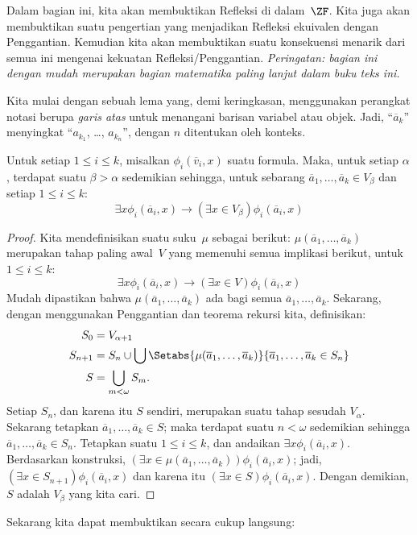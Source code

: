 \documentclass[../../../include/open-logic-section]{subfiles}
\begin{document}

Dalam bagian ini, kita akan membuktikan Refleksi di dalam~$\ZF$. Kita juga
akan membuktikan suatu pengertian yang menjadikan Refleksi ekuivalen dengan
Penggantian. Kemudian kita akan membuktikan suatu konsekuensi menarik dari
semua ini mengenai kekuatan Refleksi/Penggantian. \emph{Peringatan: bagian ini
dengan mudah merupakan bagian matematika paling lanjut dalam buku teks ini.}

Kita mulai dengan sebuah lema yang, demi keringkasan, menggunakan perangkat
notasi berupa \emph{garis atas} untuk menangani barisan variabel atau objek.
Jadi, ``$\overline{a}_k$'' menyingkat ``$a_{k_1}$, \dots, $a_{k_n}$'',
dengan $n$ ditentukan oleh konteks.

\begin{lem}
Untuk setiap $1\leq i\leq k$, misalkan
$\phi_i(\overline{v}_i,x)$ suatu formula. Maka, untuk setiap $\alpha$,
terdapat suatu $\beta>\alpha$ sedemikian sehingga, untuk sebarang
$\overline{a}_1,\ldots,\overline{a}_k\in V_\beta$ dan setiap
$1\leq i\leq k$:
\[
	\exists x\phi_i(\overline{a}_i, x) \rightarrow (\exists x \in V_\beta) \phi_i(\overline{a}_i, x)
\]
\end{lem}

\begin{proof}
Kita mendefinisikan suatu suku~$\mu$ sebagai berikut:
$\mu(\overline{a}_1,\ldots,\overline{a}_k)$ merupakan tahap paling awal~$V$
yang memenuhi semua implikasi berikut, untuk $1\leq i\leq k$:
\[
\exists x\phi_i(\overline{a}_i, x) \rightarrow (\exists x \in V) \phi_i(\overline{a}_i, x)
\]
Mudah dipastikan bahwa $\mu(\overline{a}_1,\ldots,\overline{a}_k)$ ada bagi
semua $\overline{a}_1,\ldots,\overline{a}_k$. Sekarang, dengan menggunakan
Penggantian dan teorema rekursi kita, definisikan:
\begin{align*}
	S_0 & = V_{\alpha+1}\\
	S_{n+1} & = S_n \cup \bigcup
	\Setabs{\mu(\overline{a}_1, \ldots, \overline{a}_k)}
	{\overline{a}_1, \ldots, \overline{a}_k \in S_n} \\
	S &= \bigcup_{m < \omega} S_m.
\end{align*}
Setiap $S_n$, dan karena itu $S$ sendiri, merupakan suatu tahap sesudah
$V_\alpha$. Sekarang tetapkan
$\overline{a}_1,\dots,\overline{a}_k\in S$; maka terdapat suatu
$n<\omega$ sedemikian sehingga
$\overline{a}_1,\dots,\overline{a}_k\in S_n$. Tetapkan suatu
$1\leq i\leq k$, dan andaikan
$\exists x\phi_i(\overline{a}_i,x)$. Berdasarkan konstruksi,
$(\exists x\in\mu(\overline{a}_1,\ldots,\overline{a}_k))
\phi_i(\overline{a}_i,x)$; jadi,
$(\exists x\in S_{n+1})\phi_i(\overline{a}_i,x)$ dan karena itu
$(\exists x\in S)\phi_i(\overline{a}_i,x)$. Dengan demikian, $S$ adalah
$V_\beta$ yang kita cari.
\end{proof}
\noindent
Sekarang kita dapat membuktikan
 secara cukup langsung:
\end{document}
